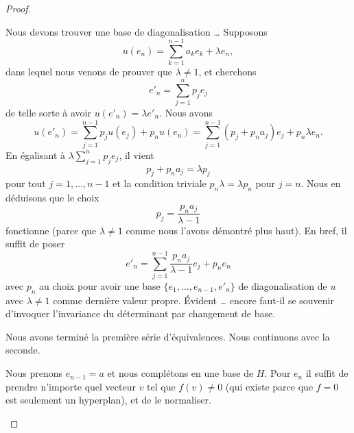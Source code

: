 \begin{proof}
\begin{subproof}
		Nous devons trouver une base de diagonalisation \ldots{} Supposons
		\begin{equation}
			u(e_n)=\sum_{k=1}^{n-1}a_ke_k+\lambda e_n,
		\end{equation}
		dans lequel nous venons de prouver que \( \lambda\neq 1\), et cherchons
		\begin{equation}
			e'_n=\sum_{j=1}^np_je_j
		\end{equation}
		de telle sorte à avoir \( u(e'_n)=\lambda e'_n\). Nous avons
		\begin{equation}
			u(e'_n)=\sum_{j=1}^{n-1}p_ju(e_j)+p_nu(e_n) =\sum_{j=1}^{n-1}(p_j+p_na_j)e_j+p_n\lambda e_n.
		\end{equation}
		En égalisant à \( \lambda\sum_{j=1}^np_je_j\), il vient
		\begin{equation}
			p_j+p_na_j=\lambda p_j
		\end{equation}
		pour tout \( j=1,\ldots, n-1\) et la condition triviale \( p_n\lambda=\lambda p_n\) pour \( j=n\). Nous en déduisons que le choix
		\begin{equation}
			p_j=\frac{ p_na_j }{ \lambda-1 }
		\end{equation}
		fonctionne (parce que \( \lambda\neq 1\) comme nous l'avons démontré plus haut). En bref, il suffit de poser
		\begin{equation}
			e'_n=\sum_{j=1}^{n-1}\frac{ p_na_j }{ \lambda-1 }e_j+p_ne_n
		\end{equation}
		avec \( p_n\) au choix pour avoir une base \( \{ e_1,\ldots, e_{n-1},e'_n \}\) de diagonalisation de \( u\) avec \( \lambda\neq 1\) comme dernière valeur propre.
		 Évident \ldots{} encore faut-il se souvenir d'invoquer l'invariance du déterminant par changement de base.
	\end{subproof}
	Nous avons terminé la première série d'équivalences. Nous continuons avec la seconde.
	\begin{subproof}
		Nous prenons \( e_{n-1}=a\) et nous complétons en une base de \( H\). Pour \( e_n\) il suffit de prendre n'importe quel vecteur \( v\) tel que \( f(v)\neq 0\) (qui existe parce que \( f=0\) est seulement un hyperplan), et de le normaliser.


\end{subproof}
\end{proof}
